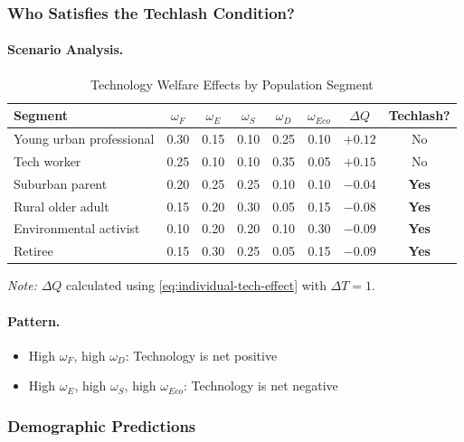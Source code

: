 \subsubsection{Who Satisfies the Techlash Condition?}

\paragraph{Scenario Analysis.}

\begin{table}[htbp]
\centering
\caption{Technology Welfare Effects by Population Segment}
\label{tab:population-segments}
\small
\begin{tabular}{@{}lccccccc@{}}
\toprule
\textbf{Segment} & $\omega_F$ & $\omega_E$ & $\omega_S$ & $\omega_D$ & $\omega_{Eco}$ & $\Delta Q$ & \textbf{Techlash?} \\
\midrule
Young urban professional & 0.30 & 0.15 & 0.10 & 0.25 & 0.10 & $+0.12$ & No \\
Tech worker & 0.25 & 0.10 & 0.10 & 0.35 & 0.05 & $+0.15$ & No \\
Suburban parent & 0.20 & 0.25 & 0.25 & 0.10 & 0.10 & $-0.04$ & \textbf{Yes} \\
Rural older adult & 0.15 & 0.20 & 0.30 & 0.05 & 0.15 & $-0.08$ & \textbf{Yes} \\
Environmental activist & 0.10 & 0.20 & 0.20 & 0.10 & 0.30 & $-0.09$ & \textbf{Yes} \\
Retiree & 0.15 & 0.30 & 0.25 & 0.05 & 0.15 & $-0.09$ & \textbf{Yes} \\
\bottomrule
\end{tabular}
\begin{flushleft}
\small\textit{Note:} $\Delta Q$ calculated using \eqref{eq:individual-tech-effect} with $\Delta T = 1$.
\end{flushleft}
\end{table}

\paragraph{Pattern.}
\begin{itemize}
    \item High $\omega_F$, high $\omega_D$: Technology is net positive
    \item High $\omega_E$, high $\omega_S$, high $\omega_{Eco}$: Technology is net negative
\end{itemize}

\subsubsection{Demographic Predictions}

